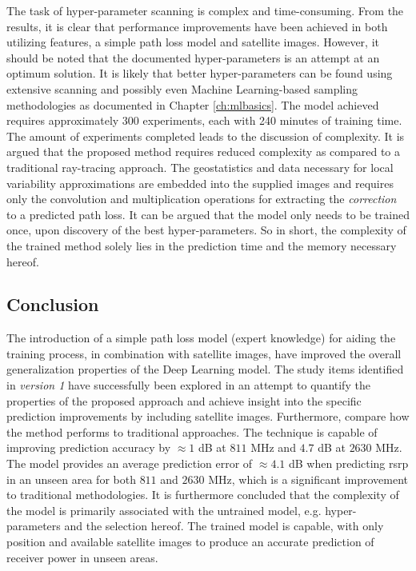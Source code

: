 The task of hyper-parameter scanning is complex and time-consuming. From the results, it is clear that performance improvements have been achieved in both utilizing features, a simple path loss model and satellite images. However, it should be noted that the documented hyper-parameters is an attempt at an optimum solution. It is likely that better hyper-parameters can be found using extensive scanning and possibly even Machine Learning-based sampling methodologies as documented in Chapter \ref{ch:mlbasics}. The model achieved requires approximately 300 experiments, each with 240 minutes of training time. The amount of experiments completed leads to the discussion of complexity. It is argued that the proposed method requires reduced complexity as compared to a traditional ray-tracing approach. The geostatistics and data necessary for local variability approximations are embedded into the supplied images and requires only the convolution and multiplication operations for extracting the \emph{correction} to a predicted path loss. It can be argued that the model only needs to be trained once, upon discovery of the best hyper-parameters. So in short, the complexity of the trained method solely lies in the prediction time and the memory necessary hereof. 

\subsection{Conclusion}\label{subsec:conclusion_v2}
The introduction of a simple path loss model (expert knowledge) for aiding the training process, in combination with satellite images, have improved the overall generalization properties of the Deep Learning model. The study items identified in \emph{version 1} have successfully been explored in an attempt to quantify the properties of the proposed approach and achieve insight into the specific prediction improvements by including satellite images. Furthermore, compare how the method performs to traditional approaches. The technique is capable of improving prediction accuracy by $\approx 1$ dB at $811$ MHz and $4.7$ dB at $2630$ MHz. The model provides an average prediction error of $\approx 4.1$ dB when predicting \gls{rsrp} in an unseen area for both $811$ and $2630$ MHz, which is a significant improvement to traditional methodologies. It is furthermore concluded that the complexity of the model is primarily associated with the untrained model, e.g. hyper-parameters and the selection hereof. The trained model is capable, with only position and available satellite images to produce an accurate prediction of receiver power in unseen areas.
